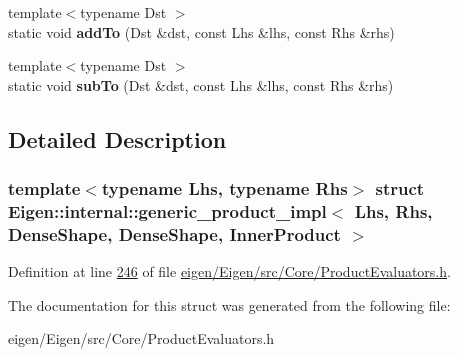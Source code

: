 \begin{DoxyCompactItemize}
{\footnotesize template$<$typename Dst $>$ }\\static void {\bfseries add\+To} (Dst \&dst, const Lhs \&lhs, const Rhs \&rhs)
\item 
\mbox{\label{struct_eigen_1_1internal_1_1generic__product__impl_3_01_lhs_00_01_rhs_00_01_dense_shape_00_01_dea94f9499d65c14b4f0b179cda95872e3_a2d94248fa40b143c4e7e1d58026b6340}} 
{\footnotesize template$<$typename Dst $>$ }\\static void {\bfseries sub\+To} (Dst \&dst, const Lhs \&lhs, const Rhs \&rhs)
\end{DoxyCompactItemize}


\subsection{Detailed Description}
\subsubsection*{template$<$typename Lhs, typename Rhs$>$\newline
struct Eigen\+::internal\+::generic\+\_\+product\+\_\+impl$<$ Lhs, Rhs, Dense\+Shape, Dense\+Shape, Inner\+Product $>$}



Definition at line \hyperlink{eigen_2_eigen_2src_2_core_2_product_evaluators_8h_source_l00246}{246} of file \hyperlink{eigen_2_eigen_2src_2_core_2_product_evaluators_8h_source}{eigen/\+Eigen/src/\+Core/\+Product\+Evaluators.\+h}.



The documentation for this struct was generated from the following file\+:\begin{DoxyCompactItemize}
\item 
eigen/\+Eigen/src/\+Core/\+Product\+Evaluators.\+h\end{DoxyCompactItemize}
